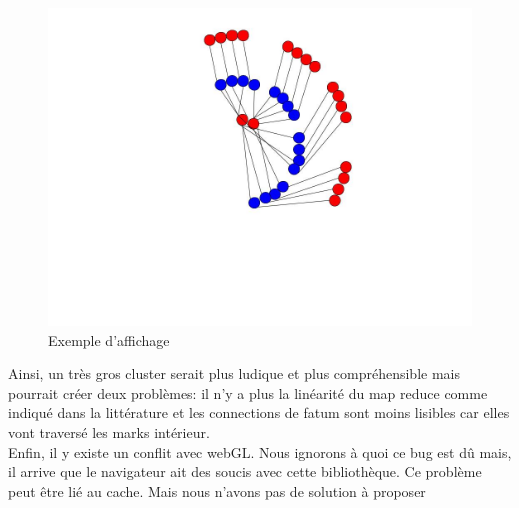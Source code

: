 \begin{figure}[H]
  \centering
    \includegraphics[scale=0.5]{images/cyclique.jpg}
        \caption{Exemple d'affichage}
\end{figure}
Ainsi, un très gros cluster serait plus ludique et plus compréhensible mais pourrait créer deux problèmes: il n'y a plus la linéarité du map reduce comme indiqué dans la littérature et les connections de fatum sont moins lisibles car elles vont traversé les marks intérieur.\\

Enfin, il y existe un conflit avec webGL. Nous ignorons à quoi ce bug est dû mais, il arrive que le navigateur ait des soucis avec cette bibliothèque. Ce problème peut être lié au cache. Mais nous n'avons pas de solution à proposer

